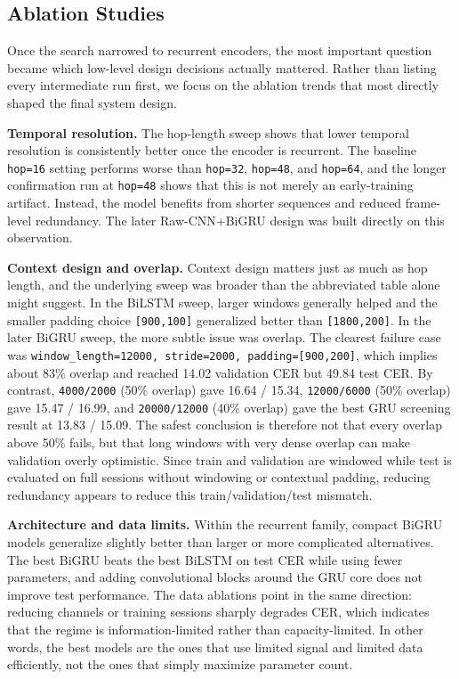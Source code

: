 \subsection{Ablation Studies}

Once the search narrowed to recurrent encoders, the most important question became which low-level design decisions actually mattered. Rather than listing every intermediate run first, we focus on the ablation trends that most directly shaped the final system design.

\noindent\textbf{Temporal resolution.} The hop-length sweep shows that lower temporal resolution is consistently better once the encoder is recurrent. The baseline \texttt{hop=16} setting performs worse than \texttt{hop=32}, \texttt{hop=48}, and \texttt{hop=64}, and the longer confirmation run at \texttt{hop=48} shows that this is not merely an early-training artifact. Instead, the model benefits from shorter sequences and reduced frame-level redundancy. The later Raw-CNN+BiGRU design was built directly on this observation.

\noindent\textbf{Context design and overlap.} Context design matters just as much as hop length, and the underlying sweep was broader than the abbreviated table alone might suggest. In the BiLSTM sweep, larger windows generally helped and the smaller padding choice \texttt{[900,100]} generalized better than \texttt{[1800,200]}. In the later BiGRU sweep, the more subtle issue was overlap. The clearest failure case was \texttt{window\_length=12000, stride=2000, padding=[900,200]}, which implies about 83\% overlap and reached 14.02 validation CER but 49.84 test CER. By contrast, \texttt{4000/2000} (50\% overlap) gave 16.64 / 15.34, \texttt{12000/6000} (50\% overlap) gave 15.47 / 16.99, and \texttt{20000/12000} (40\% overlap) gave the best GRU screening result at 13.83 / 15.09. The safest conclusion is therefore not that every overlap above 50\% fails, but that long windows with very dense overlap can make validation overly optimistic. Since train and validation are windowed while test is evaluated on full sessions without windowing or contextual padding, reducing redundancy appears to reduce this train/validation/test mismatch.

\noindent\textbf{Architecture and data limits.} Within the recurrent family, compact BiGRU models generalize slightly better than larger or more complicated alternatives. The best BiGRU beats the best BiLSTM on test CER while using fewer parameters, and adding convolutional blocks around the GRU core does not improve test performance. The data ablations point in the same direction: reducing channels or training sessions sharply degrades CER, which indicates that the regime is information-limited rather than capacity-limited. In other words, the best models are the ones that use limited signal and limited data efficiently, not the ones that simply maximize parameter count.

